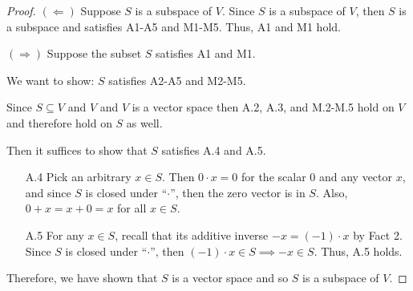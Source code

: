 \documentclass[12pt]{article}
\theoremstyle{definition}
\begin{document}
\begin{proof}
$(\Leftarrow)$ Suppose $S$ is a subspace of $V$. Since $S$ is a subspace of $V$, then $S$ is
a subspace and satisfies A1-A5 and M1-M5. Thus, A1 and M1 hold.

$(\Rightarrow)$ Suppose the subset $S$ satisfies A1 and M1.

\vspace{0.2cm}

We want to show: $S$ satisfies A2-A5 and M2-M5.

\vspace{0.2cm}

Since $S \subseteq V$ and $V$ and $V$ is a vector space then A.2, A.3, and M.2-M.5 hold on $V$ and
therefore hold on $S$ as well.

\vspace{0.2cm}

Then it suffices to show that $S$ satisfies A.4 and A.5.

\begin{itemize}

\item [A.4] Pick an arbitrary $x \in S$. Then $0 \cdot x = 0$ for the scalar $0$ and any vector $x$, and since
$S$ is closed under ``$\cdot$'', then the zero vector is in $S$. Also, $0 + x = x + 0 = x$ for all $x \in S$.

\item [A.5] For any $x \in S$, recall that its additive inverse $-x = (-1) \cdot x$ by Fact 2. Since $S$ 
is closed under ``$\cdot$'', then $(-1) \cdot x \in S \implies -x \in S$. Thus, A.5 holds.

\end{itemize}

Therefore, we have shown that $S$ is a vector space and so $S$ is a subspace of $V$.

\end{proof}
\end{document}
